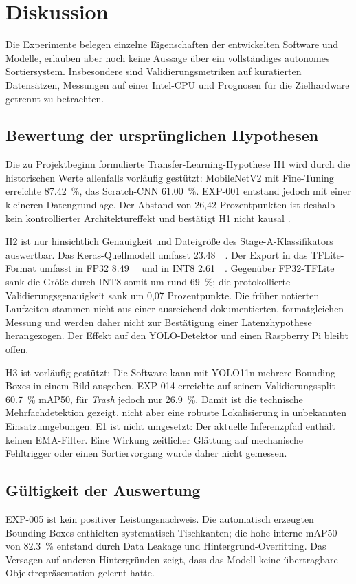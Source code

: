 \section{Diskussion}
Die Experimente belegen einzelne Eigenschaften der entwickelten Software und Modelle, erlauben aber noch keine Aussage über ein vollständiges autonomes Sortiersystem. Insbesondere sind Validierungsmetriken auf kuratierten Datensätzen, Messungen auf einer Intel-CPU und Prognosen für die Zielhardware getrennt zu betrachten.

\subsection{Bewertung der ursprünglichen Hypothesen}
Die zu Projektbeginn formulierte Transfer-Learning-Hypothese H1 wird durch die historischen Werte allenfalls vorläufig gestützt: MobileNetV2 mit Fine-Tuning erreichte \SI{87.42}{\percent}, das Scratch-CNN \SI{61.00}{\percent}. EXP-001 entstand jedoch mit einer kleineren Datengrundlage. Der Abstand von 26,42 Prozentpunkten ist deshalb kein kontrollierter Architektureffekt und bestätigt H1 nicht kausal \cite{yosinski2014transferable}.

H2 ist nur hinsichtlich Genauigkeit und Dateigröße des Stage-A-Klassifikators auswertbar. Das Keras-Quellmodell umfasst \SI{23.48}{\mebi\byte}. Der Export in das TFLite-Format umfasst in FP32 \SI{8.49}{\mebi\byte} und in INT8 \SI{2.61}{\mebi\byte}. Gegenüber FP32-TFLite sank die Größe durch INT8 somit um rund \SI{69}{\percent}; die protokollierte Validierungsgenauigkeit sank um 0,07 Prozentpunkte. Die früher notierten Laufzeiten stammen nicht aus einer ausreichend dokumentierten, formatgleichen Messung und werden daher nicht zur Bestätigung einer Latenzhypothese herangezogen. Der Effekt auf den YOLO-Detektor und einen Raspberry Pi bleibt offen.

H3 ist vorläufig gestützt: Die Software kann mit YOLO11n mehrere Bounding Boxes in einem Bild ausgeben. EXP-014 erreichte auf seinem Validierungssplit \SI{60.7}{\percent} mAP50, für \textit{Trash} jedoch nur \SI{26.9}{\percent}. Damit ist die technische Mehrfachdetektion gezeigt, nicht aber eine robuste Lokalisierung in unbekannten Einsatzumgebungen. E1 ist nicht umgesetzt: Der aktuelle Inferenzpfad enthält keinen EMA-Filter. Eine Wirkung zeitlicher Glättung auf mechanische Fehltrigger oder einen Sortiervorgang wurde daher nicht gemessen.

\subsection{Gültigkeit der Auswertung}
EXP-005 ist kein positiver Leistungsnachweis. Die automatisch erzeugten Bounding Boxes enthielten systematisch Tischkanten; die hohe interne mAP50 von \SI{82.3}{\percent} entstand durch Data Leakage und Hintergrund-Overfitting. Das Versagen auf anderen Hintergründen zeigt, dass das Modell keine übertragbare Objektrepräsentation gelernt hatte.

